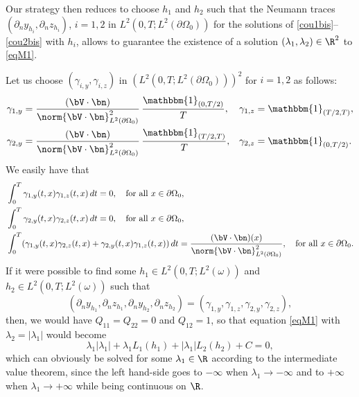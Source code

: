 Our strategy then reduces to choose $h_1$ and $h_2$ such that the Neumann traces $(\partial_n y_{h_i},\partial_n z_{h_i})$, $i=1,2$ in $L^2(0,T; L^2(\partial\Omega_0))$ for the solutions of \eqref{cou1bis}--\eqref{cou2bis} with $h_i$, allows to guarantee the existence of a solution $(\lambda_1, \lambda_2) \in \R^2$ to \eqref{eqM1}.

Let us choose $(\gamma_{i,y}, \gamma_{i,z})$ in $(L^2(0,T; L^2(\partial \Omega_0)))^2$ for $i = 1, 2$ as follows:
\begin{align*}
\gamma_{1,y} &= \frac{(\bV \cdot \bn)}{\norm{\bV\cdot \bn}_{L^2(\partial\Omega_0)}^2}\, \frac{\mathbbm{1}_{(0,T/2)} }{T},
&\gamma_{1,z} &= \mathbbm{1}_{(T/2,T)},
\\
\gamma_{2, y} &= \frac{(\bV \cdot \bn)}{\norm{\bV\cdot \bn}_{L^2(\partial\Omega_0)}^2}\, \frac{\mathbbm{1}_{(T/2,T)} }{T},
&\gamma_{2, z} &= \mathbbm{1}_{(0,T/2)}.
\end{align*}
We easily have that
\begin{align*}
& \int_0^T \gamma_{1, y} (t, x) \gamma_{1,z}(t,x) \, dt = 0, \quad\text{for all } x \in \partial \Omega_0,
\\
& \int_0^T \gamma_{2, y} (t, x) \gamma_{2,z}(t,x) \, dt = 0, \quad\text{for all } x \in \partial \Omega_0,
\\
&
\int_0^T(\gamma_{1,y} (t,x) \gamma_{2,z} (t,x)+ \gamma_{2,y} (t,x)\gamma_{1,z} (t,x))\, dt = \frac{(\bV \cdot \bn)(x)}{\norm{\bV\cdot \bn}_{L^2(\partial\Omega_0)}^2},\quad\text{for all } x \in \partial \Omega_0.
\end{align*}
If it were possible to find some $h_1\in L^2(0,T; L^2(\omega))$ and $h_2\in L^2(0,T; L^2(\omega))$ such that
\begin{equation}
\label{exh}
(\partial_{n} y_{h_1},\partial_{n} z_{h_1},\partial_{n} y_{h_2},\partial_{n}z_{h_2})
=(\gamma_{1,y},\gamma_{1,z},\gamma_{2,y},\gamma_{2,z}),
\end{equation}
then, we would have $Q_{11}=Q_{22}=0$ and $Q_{12}=1$, so that equation \eqref{eqM1} with $\lambda_2 = |\lambda_1|$ would become
\begin{equation*}
\lambda_1|\lambda_1|+\lambda_1 L_1(h_1)+|\lambda_1| L_2(h_2)+C=0,
\end{equation*}
which can obviously be solved for some $\lambda_1 \in \R$ according to the intermediate value theorem, since the left hand-side goes to $-\infty$ when $\lambda_1 \to -\infty$ and to $+\infty$ when $\lambda_1 \to +\infty$ while being continuous on $\R$.

